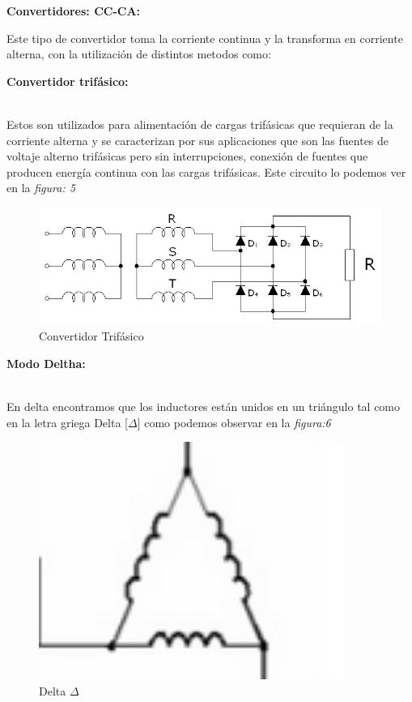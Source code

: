 \documentclass[a3paper,12pt]{article}
\begin{document}
{\begin{flushleft}
{\color{cyan}\huge{\textbf{Convertidores: CC-CA:}}}\\
\begin{LARGE}
Este tipo de convertidor toma la corriente continua y la transforma en corriente alterna, con la utilización de distintos metodos como:\\
	\hspace{3cm}\begin{huge}\textbf{Convertidor trifásico: }\end{huge}\\
	Estos son utilizados para alimentación de cargas trifásicas que requieran de la corriente alterna y se caracterizan por sus aplicaciones que son las fuentes de voltaje alterno trifásicas pero sin interrupciones, conexión de fuentes que producen energía continua con las cargas trifásicas. Este circuito lo podemos ver en la \textit{figura: 5}\\
	\begin{figure}[hbtp]
	\centering
	\includegraphics[scale=1]{trifasico.jpg}
	\caption{Convertidor Trifásico}
	\end{figure}
	\vspace{3cm}
\hspace{3cm}\begin{huge}\textbf{Modo Deltha: }\end{huge}\\
	En delta encontramos que los inductores están unidos en un triángulo tal como en la letra griega Delta [$\Delta$] como podemos observar en la \textit{figura:6}
	\begin{figure}[hbtp]
	\centering
	\includegraphics[width=10cm]{delta.png}
	\caption{Delta $\Delta$}
	\end{figure}
	

\end{LARGE}
\end{flushleft}}
\end{document}

